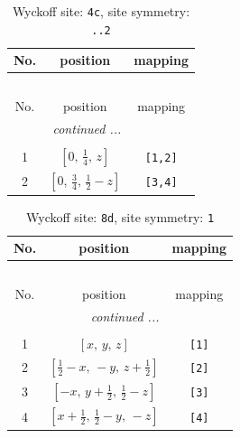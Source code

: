 \documentclass[fleqn,8pt]{jsarticle}
\begin{document}
\renewcommand{\arraystretch}{1.2}
\begin{longtable}{ccc}
\caption{Wyckoff site: {\tt 4c}, site symmetry: {\tt ..2}}
 \\
 \hline \hline
No. & position & mapping \\ \hline \endfirsthead

\multicolumn{2}{l}{\tablename\ \thetable{}} \\
 \hline \hline
No. & position & mapping \\ \hline \endhead

 \hline \hline
\multicolumn{2}{r}{\footnotesize\it continued ...} \\ \endfoot

 \hline \hline
\multicolumn{2}{r}{} \\ \endlastfoot

1 & $\left[ 0,\, \frac{1}{4},\, z \right]$ & {\tt [1,2]} \\ \hline
2 & $\left[ 0,\, \frac{3}{4},\, \frac{1}{2} - z \right]$ & {\tt [3,4]} \\
\end{longtable}
\renewcommand{\arraystretch}{1.2}
\begin{longtable}{ccc}
\caption{Wyckoff site: {\tt 8d}, site symmetry: {\tt 1}}
 \\
 \hline \hline
No. & position & mapping \\ \hline \endfirsthead

\multicolumn{2}{l}{\tablename\ \thetable{}} \\
 \hline \hline
No. & position & mapping \\ \hline \endhead

 \hline \hline
\multicolumn{2}{r}{\footnotesize\it continued ...} \\ \endfoot

 \hline \hline
\multicolumn{2}{r}{} \\ \endlastfoot

1 & $\left[ x,\, y,\, z \right]$ & {\tt [1]} \\ \hline
2 & $\left[ \frac{1}{2} - x,\, - y,\, z + \frac{1}{2} \right]$ & {\tt [2]} \\ \hline
3 & $\left[ - x,\, y + \frac{1}{2},\, \frac{1}{2} - z \right]$ & {\tt [3]} \\ \hline
4 & $\left[ x + \frac{1}{2},\, \frac{1}{2} - y,\, - z \right]$ & {\tt [4]} \\
\end{longtable}
\end{document}
